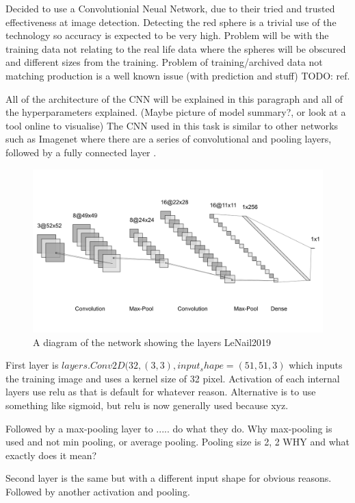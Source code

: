 \documentclass{article}
\begin{document}
Decided to use a Convolutionial Neual Network, due to their tried and trusted effectiveness at image detection.
Detecting the red sphere is a trivial use of the technology so accuracy is expected to be very high.
Problem will be with the training data not relating to the real life data where the spheres will be obscured and different sizes from the training.
Problem of training/archived data not matching production is a well known issue (with prediction and stuff) TODO: ref.

All of the architecture of the CNN will be explained in this paragraph and all of the hyperparameters explained.
(Maybe picture of model summary?, or look at a tool online to visualise)
The CNN used in this task is similar to other networks such as Imagenet where there are a series of convolutional and pooling layers, followed by a fully connected layer \cite{krizhevsky2012imagenet}.

\begin{figure}[ht]
    \centering
    \includegraphics[scale=1]{CNN_Zoomed.png}
    \caption{A diagram of the network showing the layers LeNail2019}
    \label{fig:test}
\end{figure}


First layer is 
$layers.Conv2D(32, (3, 3), input_shape=(51, 51, 3)$
which inputs the training image and uses a kernel size of 32 pixel.
Activation of each internal layers use relu as that is default for whatever reason.
Alternative is to use something like sigmoid, but relu is now generally used because xyz. 

Followed by a max-pooling layer to ..... do what they do.
Why max-pooling is used and not min pooling, or average pooling.
Pooling size is 2, 2 WHY and what exactly does it mean?

Second layer is the same but with a different input shape for obvious reasons.
Followed by another activation and pooling.
\end{document}
